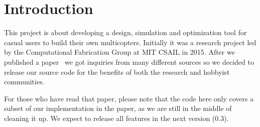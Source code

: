 \clearpage
\section{Introduction}\label{sec:intro}
This project is about developing a design, simulation and optimization tool for casual users to build their own multicopters. Initially it was a research project led by the Computational Fabrication Group at MIT CSAIL in 2015. After we published a paper~\cite{du2016} we got inquiries from many different sources so we decided to release our source code for the benefits of both the research and hobbyist communities.

For those who have read that paper, please note that the code here only covers a subset of our implementation in the paper, as we are still in the middle of cleaning it up. We expect to release all features in the next version ($0.3$).

